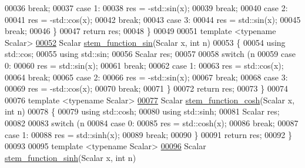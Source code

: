 \begin{DoxyCode}
00036     \textcolor{keywordflow}{break};
00037   \textcolor{keywordflow}{case} 1:
00038     res = -std::sin(x);
00039     \textcolor{keywordflow}{break};
00040   \textcolor{keywordflow}{case} 2:
00041     res = -std::cos(x);
00042     \textcolor{keywordflow}{break};
00043   \textcolor{keywordflow}{case} 3:
00044     res = std::sin(x);
00045     \textcolor{keywordflow}{break};
00046   \}
00047   \textcolor{keywordflow}{return} res;
00048 \}
00049 
00051 \textcolor{keyword}{template} <\textcolor{keyword}{typename} Scalar>
\hyperlink{namespace_eigen_1_1internal_a297dc38f5c9b80e2a1da7dcf2a453c90}{00052} Scalar \hyperlink{namespace_eigen_1_1internal_a297dc38f5c9b80e2a1da7dcf2a453c90}{stem\_function\_sin}(Scalar x, \textcolor{keywordtype}{int} n)
00053 \{
00054   \textcolor{keyword}{using} std::cos;
00055   \textcolor{keyword}{using} std::sin;
00056   Scalar res;
00057 
00058   \textcolor{keywordflow}{switch} (n %
00059   \textcolor{keywordflow}{case} 0:
00060     res = std::sin(x);
00061     \textcolor{keywordflow}{break};
00062   \textcolor{keywordflow}{case} 1:
00063     res = std::cos(x);
00064     \textcolor{keywordflow}{break};
00065   \textcolor{keywordflow}{case} 2:
00066     res = -std::sin(x);
00067     \textcolor{keywordflow}{break};
00068   \textcolor{keywordflow}{case} 3:
00069     res = -std::cos(x);
00070     \textcolor{keywordflow}{break};
00071   \}
00072   \textcolor{keywordflow}{return} res;
00073 \}
00074 
00076 \textcolor{keyword}{template} <\textcolor{keyword}{typename} Scalar>
\hyperlink{namespace_eigen_1_1internal_aab7949e5c95ec574eff5c4229da36846}{00077} Scalar \hyperlink{namespace_eigen_1_1internal_aab7949e5c95ec574eff5c4229da36846}{stem\_function\_cosh}(Scalar x, \textcolor{keywordtype}{int} n)
00078 \{
00079   \textcolor{keyword}{using} std::cosh;
00080   \textcolor{keyword}{using} std::sinh;
00081   Scalar res;
00082   
00083   \textcolor{keywordflow}{switch} (n %
00084   \textcolor{keywordflow}{case} 0:
00085     res = std::cosh(x);
00086     \textcolor{keywordflow}{break};
00087   \textcolor{keywordflow}{case} 1:
00088     res = std::sinh(x);
00089     \textcolor{keywordflow}{break};
00090   \}
00091   \textcolor{keywordflow}{return} res;
00092 \}
00093     
00095 \textcolor{keyword}{template} <\textcolor{keyword}{typename} Scalar>
\hyperlink{namespace_eigen_1_1internal_ab2855d150c9eebb8ed6cb63a292dda0d}{00096} Scalar \hyperlink{namespace_eigen_1_1internal_ab2855d150c9eebb8ed6cb63a292dda0d}{stem\_function\_sinh}(Scalar x, \textcolor{keywordtype}{int} n)

\end{DoxyCode}
